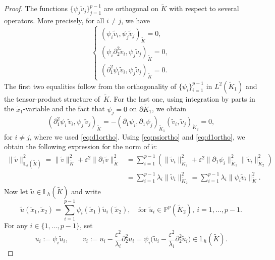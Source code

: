 \documentclass[a4paper,twoside,10pt]{article}
\newcommand{\eps}{\varepsilon}
\newcommand{\IL}{\mathbb{L}}
\newcommand{\IP}{\mathbb{P}}
\numberwithin{equation}{section}
\newcommand{\Kt}{\widetilde{K}}
\begin{document}
\begin{proof}
	The functions $\{\psi_j  \tilde v_j\}_{j=1}^{p-1}$ 
    are orthogonal on $\Kt$ with respect to several operators. More precisely, for all $i \neq j$, we have
	\begin{equation}\label{eq:psiortho}
	\begin{cases}
	( \psi_i  \tilde v_i, \psi_j  \tilde v_j )_{\Kt} = 0,\\
	(\psi_i  \partial_2^2 \tilde v_i, \psi_j  \tilde v_j )_{\Kt} = 0,\\
	( \partial_1^2 \psi_i  \tilde v_i, \psi_j  \tilde v_j )_{\Kt} = 0.
	\end{cases}
	\end{equation}
	The first two equalities follow from the orthogonality of $\{\psi_i\}_{i=1}^{p-1}$ in $L^2(\Kt_1)$ and the tensor-product structure of~$\Kt$. For the last one, using integration by parts in the $\widetilde x_1$-variable and the fact that $\psi_j=0$ on $\partial\Kt_1$, we obtain
	\begin{equation*}
	(\partial_1^2\psi_i\,\tilde v_i,\psi_j\,\tilde v_j)_{\Kt}
	=
	-(\partial_1\psi_i,\partial_1\psi_j)_{\Kt_1}
	(\tilde v_i,\tilde v_j)_{\Kt_2}
	=0,
	\end{equation*}
	for \(i\neq j\), where we used \eqref{eq:d1ortho}.
	Using \eqref{eq:psiortho} and \eqref{eq:d1ortho}, we obtain the following expression for the norm of $\tilde v$:
	\begin{equation}\label{eq:norm-psiortho}
		\begin{split}
			\|\tilde v\|_{\mathbb L_h(\Kt)}^2
			=
			\|\tilde v\|_{\Kt}^2
			+\eps^2\|\partial_1\tilde v\|_{\Kt}^2
			&=
			\sum_{i=1}^{p-1}
			\left(
			\|\tilde v_i\|_{\Kt_2}^2
			+\eps^2\|\partial_1\psi_i\|_{\Kt_1}^2
			\|\tilde v_i\|_{\Kt_2}^2
			\right)
			\\
			&=
			\sum_{i=1}^{p-1}\lambda_i\|\tilde v_i\|_{\Kt_2}^2
			=
			\sum_{i=1}^{p-1}\lambda_i\|\psi_i\tilde v_i\|_{\Kt}^2 .
		\end{split}
	\end{equation}
	Now let \(\tilde u\in \IL_h(\Kt)\) and write 
	\begin{equation*}
	\tilde u(\widetilde x_1,\widetilde x_2)
	=
	\sum_{i=1}^{p-1}\psi_i(\widetilde x_1)\tilde u_i(\widetilde x_2),
	\quad  \text{for } \tilde{u}_i\in \IP^p(\Kt_2), \ i = 1, \ldots, p-1.
	\end{equation*}
	For any $i\in\{1,\dots,p-1\}$, set
	\begin{equation*}
	u_i:=\psi_i\tilde u_i,
	\qquad
	v_i:=u_i-\frac{\eps^2}{\lambda_i}\partial_2^2u_i
	=
	\psi_i\Big(\tilde u_i-\frac{\eps^2}{\lambda_i}\partial_2^2\tilde u_i\Big)\in \IL_h(\Kt).
	\end{equation*}
    

\end{proof}
\end{document}

